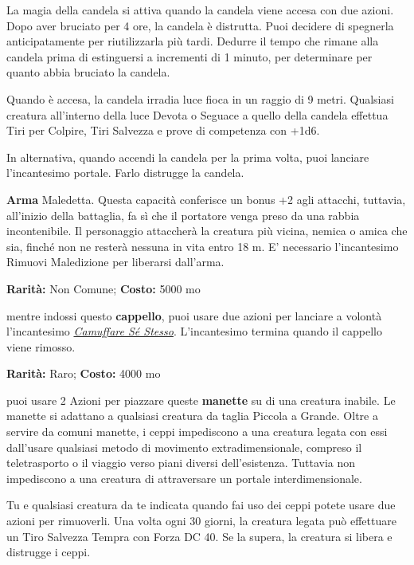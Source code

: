 \begin{multicols}{2}
La magia della candela si attiva quando la candela viene accesa con due azioni. Dopo aver bruciato per 4 ore, la candela è distrutta. Puoi decidere di spegnerla anticipatamente per riutilizzarla più tardi. Dedurre il tempo che rimane alla candela prima di estinguersi a incrementi di 1 minuto, per determinare per quanto abbia bruciato la candela.

Quando è accesa, la candela irradia luce fioca in un raggio di 9 metri. Qualsiasi creatura all'interno della luce Devota o Seguace a quello della candela effettua Tiri per Colpire, Tiri Salvezza e prove di competenza con +1d6.

In alternativa, quando accendi la candela per la prima volta, puoi lanciare l'incantesimo portale. Farlo distrugge la candela.


\textbf{Arma} Maledetta. Questa capacità conferisce un bonus +2 agli attacchi, tuttavia, all'inizio della battaglia, fa sì che il portatore venga preso da una rabbia incontenibile. Il personaggio attaccherà la creatura più vicina, nemica o amica che sia, finché non ne resterà nessuna in vita entro 18 m. E' necessario l'incantesimo Rimuovi Maledizione per liberarsi dall'arma.


\textbf{Rarità:} Non Comune; \textbf{Costo:} 5000 mo

mentre indossi questo \textbf{cappello}, puoi usare due azioni per lanciare a volontà l'incantesimo \emph{\hyperlink{Camuffare Sé Stesso}{Camuffare Sé Stesso}}. L'incantesimo termina quando il cappello viene rimosso.


\textbf{Rarità:} Raro; \textbf{Costo:} 4000 mo

puoi usare 2 Azioni per piazzare queste \textbf{manette} su di una creatura inabile. Le manette si adattano a qualsiasi creatura da taglia Piccola a Grande. Oltre a servire da comuni manette, i ceppi impediscono a una creatura legata con essi dall'usare qualsiasi metodo di movimento extradimensionale, compreso il teletrasporto o il viaggio verso piani diversi dell'esistenza. Tuttavia non impediscono a una creatura di attraversare un portale interdimensionale.

Tu e qualsiasi creatura da te indicata quando fai uso dei ceppi potete usare due azioni per rimuoverli. Una volta ogni 30 giorni, la creatura legata può effettuare un Tiro Salvezza Tempra con Forza DC 40. Se la supera, la creatura si libera e distrugge i ceppi.


\end{multicols}
